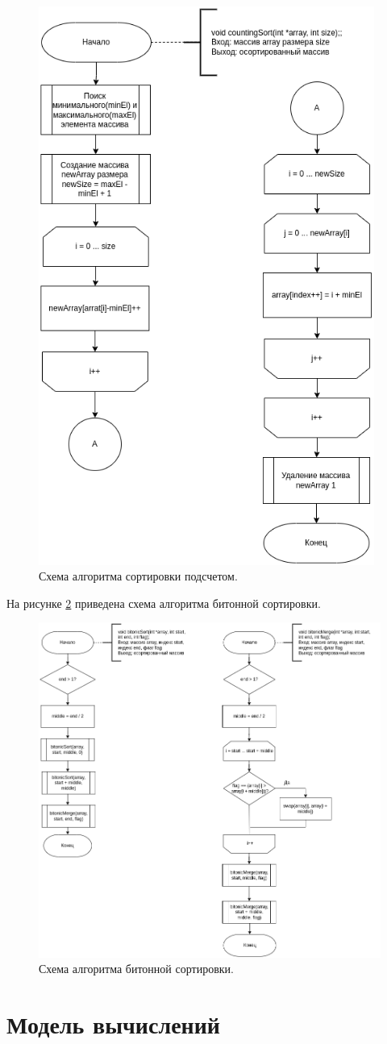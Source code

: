 \begin{figure}[h]
	\centering
	\includegraphics[width=110mm]{images/counting}
	\caption{Схема алгоритма сортировки подсчетом.}
	\label{img:counting}
\end{figure}

\newpage
На рисунке \ref{img:bitonic} приведена схема алгоритма битонной сортировки.
\begin{figure}[h]
	\centering
	\includegraphics[width=175mm]{images/bitonic}
	\caption{Схема алгоритма битонной сортировки.}
	\label{img:bitonic}
\end{figure}

\section{Модель вычислений}